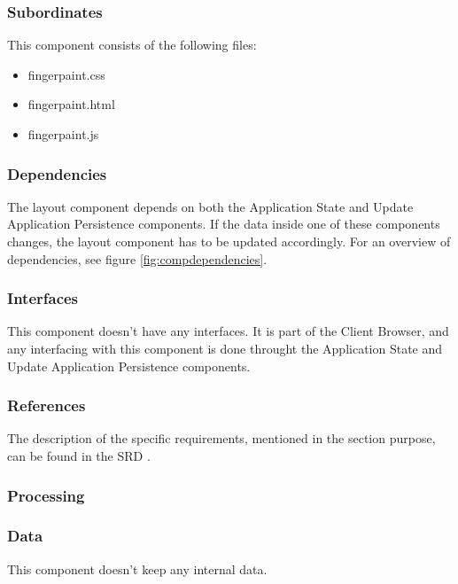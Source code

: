 \subsubsection*{Subordinates}
This component consists of the following files:
\begin{itemize}
\item fingerpaint.css
\item fingerpaint.html
\item fingerpaint.js
\end{itemize}

\subsubsection*{Dependencies}
The layout component depends on both the Application State and Update Application Persistence components. If the data inside one of these components changes, the layout component has to be updated accordingly. For an overview of dependencies, see figure \ref{fig:compdependencies}.

\subsubsection*{Interfaces}
This component doesn't have any interfaces. It is part of the Client Browser, and any interfacing with this component is done throught the Application State and Update Application Persistence components.

\subsubsection*{References}
The description of the specific requirements, mentioned in the section purpose, can be found in the SRD \cite{srd}.

\subsubsection*{Processing}

\subsubsection*{Data}
This component doesn't keep any internal data.

